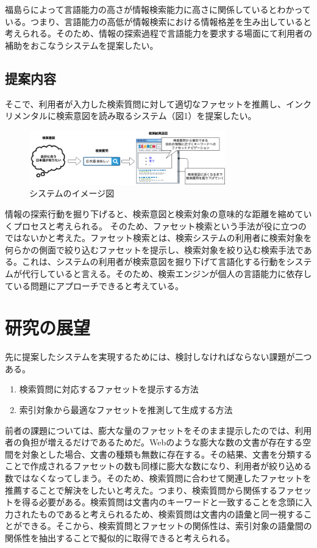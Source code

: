 \documentclass[a4j,12pt, twocolumn]{jarticle}
\begin{document}
 福島らによって言語能力の高さが情報検索能力に高さに関係しているとわかっている\cite{fukushima}。つまり、言語能力の高低が情報検索における情報格差を生み出していると考えられる。そのため、情報の探索過程で言語能力を要求する場面にて利用者の補助をおこなうシステムを提案したい。
\subsection{提案内容}

 そこで、利用者が入力した検索質問に対して適切なファセットを推薦し、インクリメンタルに検索意図を読み取るシステム（図1）を提案したい。

 \begin{figure}[h]
   \includegraphics[width=85mm]{./new_ir_with_navi.png}
   \caption{システムのイメージ図}
 \end{figure}
 
 情報の探索行動を掘り下げると、検索意図と検索対象の意味的な距離を縮めていくプロセスと考えられる。 そのため、ファセット検索という手法が役に立つのではないかと考えた。ファセット検索とは、検索システムの利用者に検索対象を何らかの側面で絞り込むファセットを提示し、検索対象を絞り込む検索手法である\cite{faceted}。これは、システムの利用者が検索意図を掘り下げて言語化する行動をシステムが代行していると言える。そのため、検索エンジンが個人の言語能力に依存している問題にアプローチできると考えている。
\section{研究の展望}
 先に提案したシステムを実現するためには、検討しなければならない課題が二つある。
\begin{enumerate}
  \item 検索質問に対応するファセットを提示する方法
  \item 索引対象から最適なファセットを推測して生成する方法
\end{enumerate}

 前者の課題については、膨大な量のファセットをそのまま提示したのでは、利用者の負担が増えるだけであるためだ。Webのような膨大な数の文書が存在する空間を対象とした場合、文書の種類も無数に存在する。その結果、文書を分類することで作成されるファセットの数も同様に膨大な数になり、利用者が絞り込める数ではなくなってしまう。そのため、検索質問に合わせて関連したファセットを推薦することで解決をしたいと考えた。つまり、検索質問から関係するファセットを得る必要がある。検索質問は文書内のキーワードと一致することを念頭に入力されたものであると考えられるため、検索質問は文書内の語彙と同一視することができる。そこから、検索質問とファセットの関係性は、索引対象の語彙間の関係性を抽出することで擬似的に取得できると考えられる。
\end{document}
